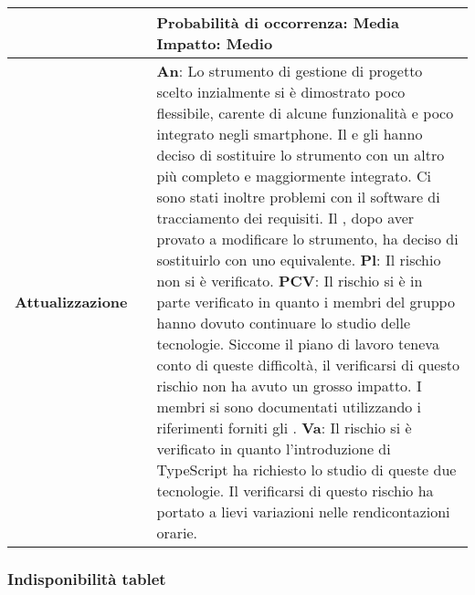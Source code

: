 \begin{table}[H]
\begin{center}
\begin{tabular}{p{2.5cm}p{0.5cm}p{11cm}}
			& &
			\textbf{Probabilità di occorrenza}: Media
			\newline
			\textbf{Impatto}: Medio
			\\
			\midrule
			\textbf{Attualizzazione}
			& &
			\textbf{An}: Lo strumento di gestione di progetto scelto inzialmente si è dimostrato poco flessibile, carente di alcune funzionalità e poco integrato negli smartphone. Il \responsabilediprogetto{} e gli \amministratori{} hanno deciso di sostituire lo strumento con un altro più completo e maggiormente integrato. Ci sono stati inoltre problemi con il software di tracciamento dei requisiti. Il \responsabilediprogetto, dopo aver provato a modificare lo strumento, ha deciso di sostituirlo con uno equivalente.
			\newline
			\textbf{Pl}: Il rischio non si è verificato.
			\newline
			\textbf{PCV}: Il rischio si è in parte verificato in quanto i membri del gruppo hanno dovuto continuare lo studio delle tecnologie. Siccome il piano di lavoro teneva conto di queste difficoltà, il verificarsi di questo rischio non ha avuto un grosso impatto. I membri si sono documentati utilizzando i riferimenti forniti gli \amministratori.
			\newline
			\textbf{Va}: Il rischio si è verificato in quanto l'introduzione di TypeScript ha richiesto lo studio di queste due tecnologie. Il verificarsi di questo rischio ha portato a lievi variazioni nelle rendicontazioni orarie.
			\\
			\bottomrule	
		\end{tabular}
	\end{center}
\end{table}			

\newpage
\subsubsection{Indisponibilità tablet}
\label{subsec:indisponibilitaTablet}


